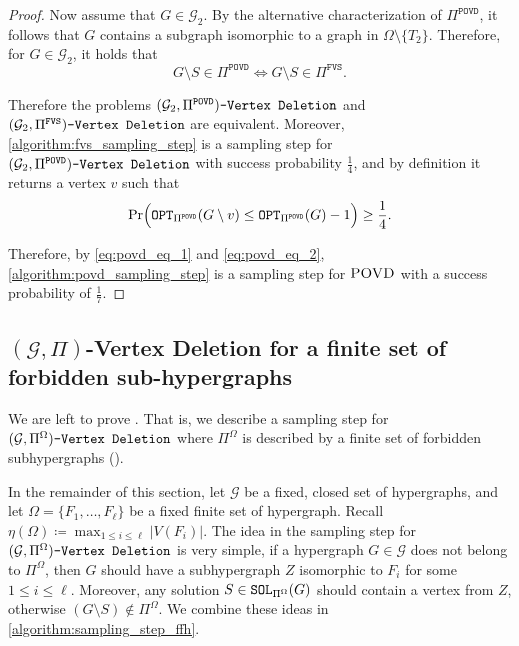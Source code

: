 \documentclass[letterpaper,11pt]{article}
\newcommand{\abs}[1]{{\left| #1\right|}}
\newcommand{\1}[1]{\mathds{1}\left[#1\right]}
\newcommand{\sat}{\textnormal{\texttt{SOL}}}
\newcommand{\OPT}{\textnormal{\texttt{OPT}}}
\newcommand{\gpivd}[1][\mathcal{G},\Pi]{(#1)\textnormal{\texttt{-Vertex Deletion}}}
\newcommand{\fvsPi}{\Pi^{\texttt{FVS}}}
\newcommand{\povdPi}{\Pi^{\texttt{POVD}}}
\newcommand{\spovd}{\textsc{POVD}\xspace}
\begin{document}
\begin{proof}
	Now assume that $G \in \mathcal{G}_2$.
	By the alternative
	characterization of $\povdPi$, it follows that $G$ contains
	a subgraph isomorphic to a graph in $\Omega \setminus \{T_2\}$.
	Therefore, for $G \in \mathcal{G}_2$, it holds that
	\begin{equation*}
		G\setminus S \in \povdPi \iff G\setminus S \in \fvsPi.
	\end{equation*}

	Therefore the problems $\gpivd[\mathcal{G}_2, \povdPi]$ and  $\gpivd[\mathcal{G}_2, \fvsPi]$
	are equivalent. Moreover, \cref{algorithm:fvs_sampling_step} is a sampling step for
	$\gpivd[\mathcal{G}_2, \povdPi]$ with success probability $\frac{1}{4}$, and by definition
	it returns a vertex $v$ such that
	\begin{equation}\label{eq:povd_eq_2}
		\Pr\Bigl( \OPT_{\povdPi}(G \setminus v) \leq \OPT_{\povdPi}(G) - 1 \Bigr) \geq \frac{1}{4}.
	\end{equation}
	

	Therefore, by \eqref{eq:povd_eq_1} and \eqref{eq:povd_eq_2},
	\cref{algorithm:povd_sampling_step} is a sampling step for $\spovd$ with a
	success probability of $\frac{1}{7}$.
\end{proof}

 
\subsection{\boldmath $(\mathcal{G},\Pi)$-Vertex Deletion for a finite set of forbidden sub-hypergraphs}
\label{sec:forbidden}

We are left to prove . That is, we 
 describe a sampling step for $\gpivd[\mathcal{G}, \Pi^{\Omega}]$ where
$\Pi^{\Omega}$ is described by a finite set of forbidden subhypergraphs ().




In the remainder of this section, let $\mathcal{G}$ be a fixed, closed set of hypergraphs, and let $\Omega = \{F_1, \ldots, F_\ell\}$ be a fixed finite set of hypergraph.  
Recall  $\eta(\Omega) \coloneqq \max_{1 \leq i \leq \ell} \abs{V\left( F_i
\right) }$.
The idea  in the sampling step for $\gpivd[\mathcal{G}, \Pi^{\Omega}]$ is very simple, if a hypergraph $G \in \mathcal{G}$ does not belong to $\Pi^{\Omega}$,
then $G$ should have a subhypergraph $Z$ isomorphic to $F_i$ for some $1 \leq i \leq \ell$.
Moreover, any solution $S \in \sat_{\Pi^{\Omega}}(G)$ should contain a vertex from $Z$, otherwise
$(G \setminus S) \not\in \Pi^{\Omega}$. We combine these ideas in \cref{algorithm:sampling_step_ffh}.
\end{document}
